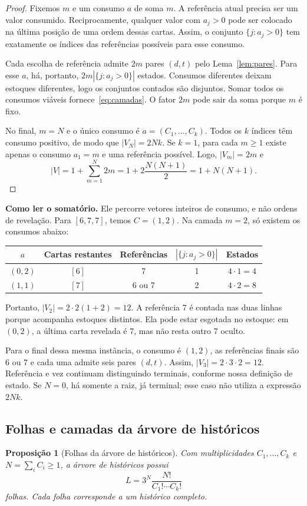 \documentclass[11pt,a4paper]{article}
\newtheorem{proposicao}{Proposição}[section]
\theoremstyle{definition}
\newcommand{\destaque}[1]{\par\smallskip\noindent\textbf{#1}\enspace}
\newcommand{\proxpagina}{\newpage}
\begin{document}
\begin{proof}
Fixemos $m$ e um consumo $a$ de soma $m$. A referência atual precisa ser um valor consumido. Reciprocamente, qualquer valor com $a_j>0$ pode ser colocado na última posição de uma ordem dessas cartas. Assim, o conjunto $\{j:a_j>0\}$ tem exatamente os índices das referências possíveis para esse consumo.

Cada escolha de referência admite $2m$ pares $(d,t)$ pelo Lema~\ref{lem:pares}. Para esse $a$, há, portanto, $2m|\{j:a_j>0\}|$ estados. Consumos diferentes deixam estoques diferentes, logo os conjuntos contados são disjuntos. Somar todos os consumos viáveis fornece~\eqref{eq:camadas}. O fator $2m$ pode sair da soma porque $m$ é fixo.

No final, $m=N$ e o único consumo é $a=(C_1,\ldots,C_k)$. Todos os $k$ índices têm consumo positivo, de modo que $|V_N|=2Nk$. Se $k=1$, para cada $m\ge1$ existe apenas o consumo $a_1=m$ e uma referência possível. Logo, $|V_m|=2m$ e
\[
|V|=1+\sum_{m=1}^{N}2m=1+2\frac{N(N+1)}2=1+N(N+1).
\]
\end{proof}

\destaque{Como ler o somatório.}
Ele percorre vetores inteiros de consumo, e não ordens de revelação. Para $[6,7,7]$, temos $C=(1,2)$. Na camada $m=2$, só existem os consumos abaixo:
\begin{center}
\begin{tabular}{@{}ccccc@{}}
\toprule
$a$ & Cartas restantes & Referências & $|\{j:a_j>0\}|$ & Estados\\
\midrule
$(0,2)$ & $[6]$ & 7 & 1 & $4\cdot1=4$\\
$(1,1)$ & $[7]$ & 6 ou 7 & 2 & $4\cdot2=8$\\
\bottomrule
\end{tabular}
\end{center}
Portanto, $|V_2|=2\cdot2(1+2)=12$. A referência 7 é contada nas duas linhas porque acompanha estoques distintos. Ela pode estar esgotada no estoque: em $(0,2)$, a última carta revelada é 7, mas não resta outro 7 oculto.

Para o final dessa mesma instância, o consumo é $(1,2)$, as referências finais são 6 ou 7 e cada uma admite seis pares $(d,t)$. Assim, $|V_3|=2\cdot3\cdot2=12$. Referência e vez continuam distinguindo terminais, conforme nossa definição de estado. Se $N=0$, há somente a raiz, já terminal; esse caso não utiliza a expressão $2Nk$.

\proxpagina
\subsection{Folhas e camadas da árvore de históricos}
\begin{proposicao}[Folhas da árvore de históricos]\label{prop:folhas}
Com multiplicidades $C_1,\ldots,C_k$ e $N=\sum_i C_i\ge1$, a árvore de históricos possui
\begin{equation}\label{eq:folhas}
\boxed{\displaystyle L=3^N\frac{N!}{C_1!\cdots C_k!}}
\end{equation}
folhas. Cada folha corresponde a um histórico completo.
\end{proposicao}
\end{document}
